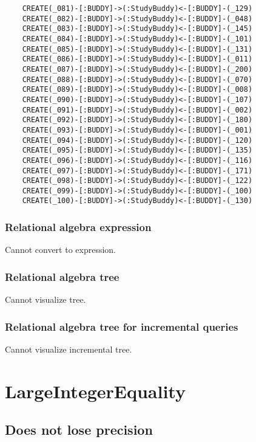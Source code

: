 \begin{lstlisting}
	CREATE(_081)-[:BUDDY]->(:StudyBuddy)<-[:BUDDY]-(_129)
	CREATE(_082)-[:BUDDY]->(:StudyBuddy)<-[:BUDDY]-(_048)
	CREATE(_083)-[:BUDDY]->(:StudyBuddy)<-[:BUDDY]-(_145)
	CREATE(_084)-[:BUDDY]->(:StudyBuddy)<-[:BUDDY]-(_101)
	CREATE(_085)-[:BUDDY]->(:StudyBuddy)<-[:BUDDY]-(_131)
	CREATE(_086)-[:BUDDY]->(:StudyBuddy)<-[:BUDDY]-(_011)
	CREATE(_087)-[:BUDDY]->(:StudyBuddy)<-[:BUDDY]-(_200)
	CREATE(_088)-[:BUDDY]->(:StudyBuddy)<-[:BUDDY]-(_070)
	CREATE(_089)-[:BUDDY]->(:StudyBuddy)<-[:BUDDY]-(_008)
	CREATE(_090)-[:BUDDY]->(:StudyBuddy)<-[:BUDDY]-(_107)
	CREATE(_091)-[:BUDDY]->(:StudyBuddy)<-[:BUDDY]-(_002)
	CREATE(_092)-[:BUDDY]->(:StudyBuddy)<-[:BUDDY]-(_180)
	CREATE(_093)-[:BUDDY]->(:StudyBuddy)<-[:BUDDY]-(_001)
	CREATE(_094)-[:BUDDY]->(:StudyBuddy)<-[:BUDDY]-(_120)
	CREATE(_095)-[:BUDDY]->(:StudyBuddy)<-[:BUDDY]-(_135)
	CREATE(_096)-[:BUDDY]->(:StudyBuddy)<-[:BUDDY]-(_116)
	CREATE(_097)-[:BUDDY]->(:StudyBuddy)<-[:BUDDY]-(_171)
	CREATE(_098)-[:BUDDY]->(:StudyBuddy)<-[:BUDDY]-(_122)
	CREATE(_099)-[:BUDDY]->(:StudyBuddy)<-[:BUDDY]-(_100)
	CREATE(_100)-[:BUDDY]->(:StudyBuddy)<-[:BUDDY]-(_130)
	\end{lstlisting}


	\subsubsection*{Relational algebra expression}

	Cannot convert to expression.

	\subsubsection*{Relational algebra tree}

	Cannot visualize tree.

	\subsubsection*{Relational algebra tree for incremental queries}

	Cannot visualize incremental tree.

	\section{LargeIntegerEquality}

	\subsection{Does not lose precision}

